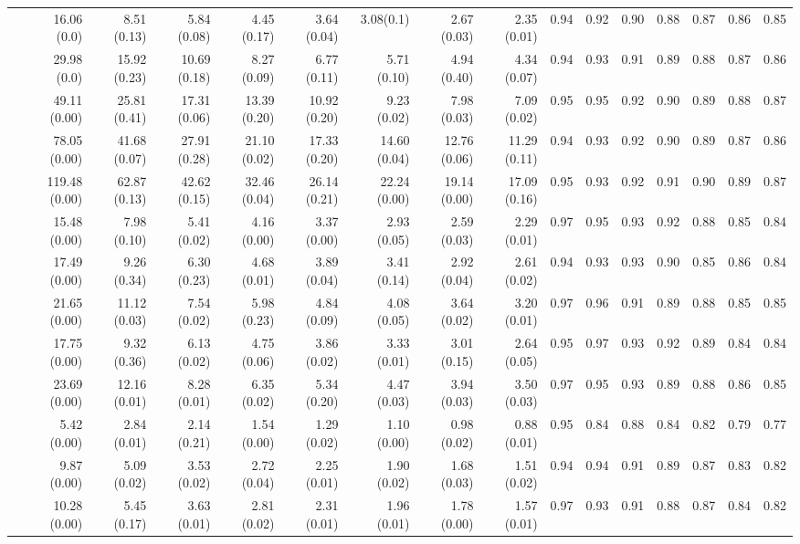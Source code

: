 \documentclass[preprint]{tlp}
\begin{document}
\begin{landscape}
\begin{tabular}{@{\extracolsep{\fill}}|c|r|r|r|r|r|r|r|r||r|r|r|r|r|r|r|}
\cline{1-16}
 & 16.06 (0.0) & 8.51 (0.13) & 5.84 (0.08) & 4.45 (0.17) & 3.64 (0.04) & 3.08(0.1) & 2.67 (0.03) & 2.35 (0.01)&0.94 & 0.92 & 0.90 & 0.88 & 0.87 & 0.86 & 0.85 \\
 & 29.98 (0.0) & 15.92 (0.23) & 10.69 (0.18) & 8.27 (0.09) & 6.77 (0.11) & 5.71 (0.10) & 4.94 (0.40) & 4.34 (0.07)&0.94 & 0.93 & 0.91 & 0.89 & 0.88 & 0.87 & 0.86 \\
 & 49.11 (0.00) & 25.81 (0.41) & 17.31 (0.06) & 13.39 (0.20) & 10.92 (0.20) & 9.23 (0.02) & 7.98 (0.03) & 7.09 (0.02)& 0.95 & 0.95 & 0.92 & 0.90 & 0.89 & 0.88 & 0.87 \\
 & 78.05 (0.00) & 41.68 (0.07) & 27.91 (0.28) & 21.10 (0.02) & 17.33 (0.20) & 14.60 (0.04) & 12.76 (0.06) & 11.29 (0.11)& 0.94 & 0.93 & 0.92 & 0.90 & 0.89 & 0.87 & 0.86 \\
 & 119.48 (0.00) & 62.87 (0.13) & 42.62 (0.15) & 32.46 (0.04) & 26.14 (0.21) & 22.24 (0.00) & 19.14 (0.00) & 17.09 (0.16)& 0.95 & 0.93 & 0.92 & 0.91 & 0.90 & 0.89 & 0.87 \\
\cline{1-16}
 & 15.48 (0.00) & 7.98 (0.10) & 5.41 (0.02) & 4.16 (0.00) & 3.37 (0.00) & 2.93 (0.05) & 2.59 (0.03) & 2.29 (0.01)& 0.97 & 0.95 & 0.93 & 0.92 & 0.88 & 0.85 & 0.84  \\
 & 17.49 (0.00) & 9.26 (0.34) & 6.30 (0.23) & 4.68 (0.01) & 3.89 (0.04) & 3.41 (0.14) & 2.92 (0.04) & 2.61 (0.02)& 0.94 & 0.93 & 0.93 & 0.90 & 0.85 & 0.86 & 0.84 \\
 & 21.65 (0.00) & 11.12 (0.03) & 7.54 (0.02) & 5.98 (0.23) & 4.84 (0.09) & 4.08 (0.05) & 3.64 (0.02) & 3.20 (0.01)& 0.97 & 0.96 & 0.91 & 0.89 & 0.88 & 0.85 & 0.85 \\
 & 17.75 (0.00) & 9.32 (0.36) & 6.13 (0.02) & 4.75 (0.06) & 3.86 (0.02) & 3.33 (0.01) & 3.01 (0.15) & 2.64 (0.05)& 0.95 & 0.97 & 0.93 & 0.92 & 0.89 & 0.84 & 0.84 \\
 & 23.69 (0.00) & 12.16 (0.01) & 8.28 (0.01) & 6.35 (0.02) & 5.34 (0.20) & 4.47 (0.03) & 3.94 (0.03) & 3.50 (0.03)& 0.97 & 0.95 & 0.93 & 0.89 & 0.88 & 0.86 & 0.85 \\
\cline{1-16}
 & 5.42 (0.00) & 2.84 (0.01) & 2.14 (0.21) & 1.54 (0.00) & 1.29 (0.02) & 1.10 (0.00) & 0.98 (0.02) & 0.88 (0.01)& 0.95 & 0.84 & 0.88 & 0.84 & 0.82 & 0.79 & 0.77 \\
 & 9.87 (0.00) & 5.09 (0.02) & 3.53 (0.02) & 2.72 (0.04) & 2.25 (0.01) & 1.90 (0.02) & 1.68 (0.03) & 1.51 (0.02)& 0.94 & 0.94 & 0.91 & 0.89 & 0.87 & 0.83 & 0.82 \\
 & 10.28 (0.00) & 5.45 (0.17) & 3.63 (0.01) & 2.81 (0.02) & 2.31 (0.01) & 1.96 (0.01) & 1.78 (0.00) & 1.57 (0.01)& 0.97 & 0.93 & 0.91 & 0.88 & 0.87 & 0.84 & 0.82 \\

\end{tabular}
\end{landscape}
\end{document}
